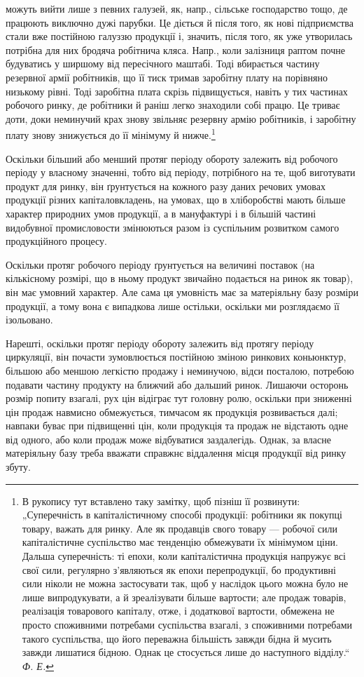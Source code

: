 \parcont{}  %
можуть вийти лише з певних галузей, як, напр., сільське господарство тощо,
де працюють виключно дужі парубки. Це діється й після того, як нові підприємства
стали вже постійною галуззю продукції і, значить, після того,
як уже утворилась потрібна для них бродяча робітнича кляса. Напр.,
коли залізниця раптом почне будуватись у ширшому від пересічного
маштабі. Тоді вбирається частину резервної армії робітників, що її тиск
тримав заробітну плату на порівняно низькому рівні. Тоді заробітна плата
скрізь підвищується, навіть у тих частинах робочого ринку, де робітники
й раніш легко знаходили собі працю. Це триває доти, доки неминучий
крах знову звільняє резервну армію робітників, і заробітну плату
знову знижується до її мінімуму й нижче.\footnote{
В рукопису тут вставлено таку замітку, щоб пізніш її розвинути: „Суперечність
в капіталістичному способі продукції: робітники як покупці товару,
важать для ринку. Але як продавців свого товару — робочої сили капіталістичне
суспільство має тенденцію обмежувати їх мінімумом ціни. Дальша суперечність:
ті епохи, коли капіталістична продукція напружує всі свої сили, регулярно з’являються
як епохи перепродукції, бо продуктивні сили ніколи не можна застосувати
так, щоб у наслідок цього можна було не лише випродукувати, а й зреалізувати
більше вартости; але продаж товарів, реалізація товарового капіталу, отже,
і додаткової вартости, обмежена не просто споживними потребами суспільства
взагалі, з споживними потребами такого суспільства, що його переважна
більшість завжди бідна й мусить завжди лишатися бідною. Однак це стосується
лише до наступного відділу.“ \emph{Ф. Е.}
}

Оскільки більший або менший протяг періоду обороту залежить від
робочого періоду у власному значенні, тобто від періоду, потрібного на
те, щоб виготувати продукт для ринку, він ґрунтується на кожного
разу даних речових умовах продукції різних капіталовкладень, на
умовах, що в хліборобстві мають більше характер природних умов продукції,
а в мануфактурі і в більшій частині видобувної промисловости
змінюються разом із суспільним розвитком самого продукційного процесу.

Оскільки протяг робочого періоду ґрунтується на величині поставок
(на кількісному розмірі, що в ньому продукт звичайно подається на ринок
як товар), він має умовний характер. Але сама ця умовність має за
матеріяльну базу розміри продукції, а тому вона є випадкова лише остільки,
оскільки ми розглядаємо її ізольовано.

Нарешті, оскільки протяг періоду обороту залежить від протягу періоду
циркуляції, він почасти зумовлюється постійною зміною ринкових
коньюнктур, більшою або меншою легкістю продажу і неминучою, відси
посталою, потребою подавати частину продукту на ближчий або дальший
ринок. Лишаючи осторонь розмір попиту взагалі, рух цін відіграє
тут головну ролю, оскільки при зниженні цін продаж навмисно обмежується,
тимчасом як продукція розвивається далі; навпаки буває при
підвищенні цін, коли продукція та продаж не відстають одне від одного,
або коли продаж може відбуватися заздалегідь. Однак, за власне матеріяльну
базу треба вважати справжнє віддалення місця продукції від
ринку збуту.
